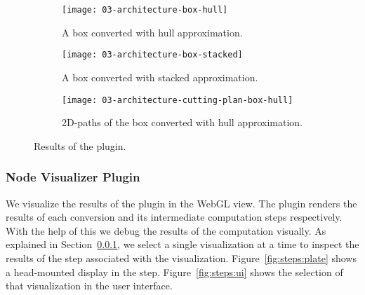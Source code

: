 \documentclass[../../ClassicThesis.tex]{subfiles}
\begin{document}
\begin{figure}[h]
  \centering
  \begin{subfigure}[a]{0.3222\textwidth}
    \texttt{[image: 03-architecture-box-hull]}
    \caption{A box converted with hull approximation.}
    \label{fig:conversion:plate}
  \end{subfigure}
  \begin{subfigure}[b]{0.3222\textwidth}
    \texttt{[image: 03-architecture-box-stacked]}
    \caption{A box converted with stacked approximation.}
    \label{fig:conversion:stacked}
  \end{subfigure}
  \begin{subfigure}[c]{0.3222\textwidth}
    \texttt{[image: 03-architecture-cutting-plan-box-hull]}
    \caption{2D-paths of the box converted with hull approximation.}
    \label{fig:conversion:paths}
  \end{subfigure}
  \caption{Results of the  plugin.}
  \label{fig:conversion}
\end{figure}


\subsubsection{Node Visualizer Plugin}

We visualize the results of the 
plugin in the WebGL view. The  plugin
renders the results of each conversion and its intermediate
computation steps respectively. With the help of this we
debug the results of the computation visually. As explained
in Section~\ref{}, we select a
single visualization at a time to inspect the results of the
step associated with the visualization.
Figure~\ref{fig:steps:plate} shows a head-mounted display in
the  step. Figure~\ref{fig:steps:ui} shows the
selection of that visualization in the user interface.
\end{document}
